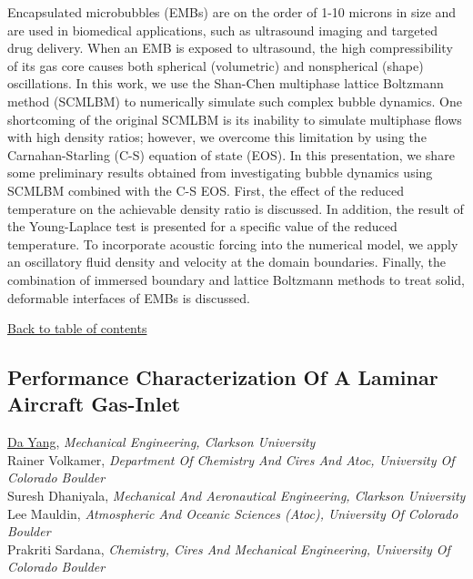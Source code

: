 \noindent Encapsulated microbubbles (EMBs) are on the order of 1-10 microns in size and are used in biomedical applications, such as ultrasound imaging and targeted drug delivery. When an EMB is exposed to ultrasound, the high compressibility of its gas core causes both spherical (volumetric) and nonspherical (shape) oscillations. In this work, we use the Shan-Chen multiphase lattice Boltzmann method (SCMLBM) to numerically simulate such complex bubble dynamics. One shortcoming of the original SCMLBM is its inability to simulate multiphase flows with high density ratios; however, we overcome this limitation by using the Carnahan-Starling (C-S) equation of state (EOS). In this presentation, we share some preliminary results obtained from investigating bubble dynamics using SCMLBM combined with the C-S EOS. First, the effect of the reduced temperature on the achievable density ratio is discussed. In addition, the result of the Young-Laplace test is presented for a specific value of the reduced temperature. To incorporate acoustic forcing into the numerical model, we apply an oscillatory fluid density and velocity at the domain boundaries. Finally, the combination of immersed boundary and lattice Boltzmann methods to treat solid, deformable interfaces of EMBs is discussed. \\ 
\begin{flushright}\vspace{-0.2 in}\hyperlink{toc}{Back to table of contents}\end{flushright}\vspace{-0.2 in}
\hypertarget{DaYang}{\subsection*{\color{CUGOLD} Performance Characterization Of A Laminar Aircraft Gas-Inlet}} \vsp 
\underline{Da Yang}, \textit{Mechanical Engineering, Clarkson University}\\ 
{Rainer Volkamer}, \textit{Department Of Chemistry And Cires And Atoc, University Of Colorado Boulder}\\ 
{Suresh Dhaniyala}, \textit{Mechanical And Aeronautical Engineering, Clarkson University}\\ 
{Lee Mauldin}, \textit{Atmospheric And Oceanic Sciences (Atoc), University Of Colorado Boulder}\\ 
{Prakriti Sardana}, \textit{Chemistry, Cires And Mechanical Engineering, University Of Colorado Boulder}\\ 
\vspace{-0.1 in} \\ 
